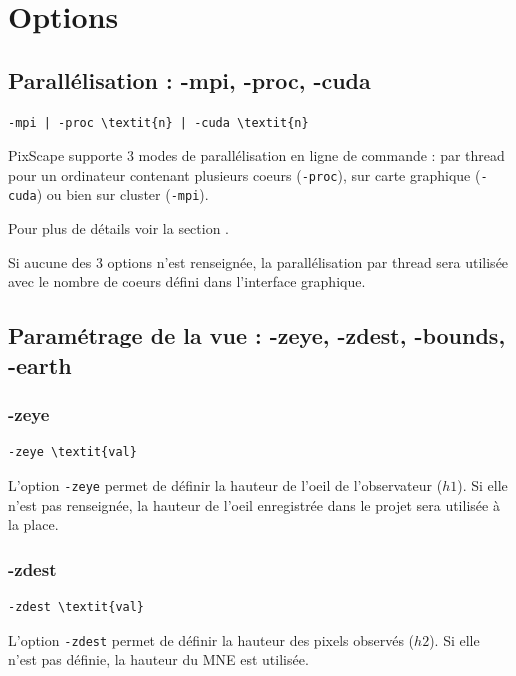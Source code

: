 \documentclass{report}
\begin{document}
\section{Options}

\subsection{Parallélisation : -mpi, -proc, -cuda}
\begin{Verbatim}[commandchars=\\\{\}]
-mpi | -proc \textit{n} | -cuda \textit{n}
\end{Verbatim}

PixScape supporte 3 modes de parallélisation en ligne de commande : par thread pour un ordinateur contenant plusieurs coeurs (\verb|-proc|), sur carte graphique (\verb|-cuda|) ou bien sur cluster (\verb|-mpi|).

Pour plus de détails voir la section .

Si aucune des 3 options n'est renseignée, la parallélisation par thread sera utilisée avec le nombre de coeurs défini dans l'interface graphique.

\subsection{Paramétrage de la vue : -zeye, -zdest, -bounds, -earth}

\subsubsection{-zeye}
\begin{Verbatim}[commandchars=\\\{\}]
-zeye \textit{val}
\end{Verbatim}
L'option \verb|-zeye| permet de définir la hauteur de l'oeil de l'observateur ($h1$). Si elle n'est pas renseignée, la hauteur de l'oeil enregistrée dans le projet sera utilisée à la place.

\subsubsection{-zdest}
\begin{Verbatim}[commandchars=\\\{\}]
-zdest \textit{val}
\end{Verbatim}
L'option \verb|-zdest| permet de définir la hauteur des pixels observés ($h2$). Si elle n'est pas définie, la hauteur du MNE est utilisée.
\end{document}
